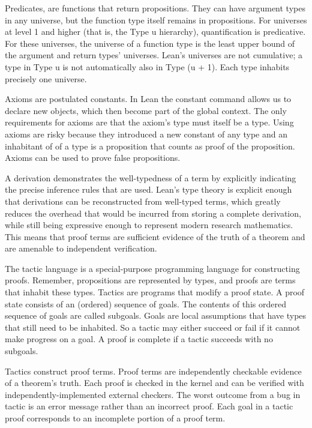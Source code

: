 \documentclass{article}
\newcommand{\1}{\mathbbm{1}}
\theoremstyle{plain}
\theoremstyle{definition}
\numberwithin{equation}{section}
\begin{document}
Predicates, are functions that return propositions. They can have argument types in any universe, but the function type itself remains in propositions. For universes at level 1 and higher (that is, the Type u hierarchy), quantification is predicative. For these universes, the universe of a function type is the least upper bound of the argument and return types' universes. Lean's universes are not cumulative; a type in Type u is not automatically also in Type (u + 1). Each type inhabits precisely one universe.

Axioms are postulated constants. In Lean the constant command allows us to declare new objects, which then become part of the global context. The only requirements for axioms are that the axiom’s type must itself be a type. Using axioms are risky because they introduced a new constant of any type and an inhabitant of of a type is a proposition that counts as proof of the proposition. Axioms can be used to prove false propositions. 

A derivation demonstrates the well-typedness of a term by explicitly indicating the precise inference rules that are used. Lean's type theory is explicit enough that derivations can be reconstructed from well-typed terms, which greatly reduces the overhead that would be incurred from storing a complete derivation, while still being expressive enough to represent modern research mathematics. This means that proof terms are sufficient evidence of the truth of a theorem and are amenable to independent verification.

The tactic language is a special-purpose programming language for constructing proofs. Remember, propositions are represented by types, and proofs are terms that inhabit these types. Tactics are programs that modify a proof state. A proof state consists of an (ordered) sequence of goals. The contents of this ordered sequence of goals are called subgoals. Goals are local assumptions that have types that still need to be inhabited. So a tactic may either succeed or fail if it cannot make progress on a goal. A proof is complete if a tactic succeeds with no subgoals.  

Tactics construct proof terms. Proof terms are independently checkable evidence of a theorem’s truth. Each proof is checked in the kernel and can be verified with independently-implemented external checkers. The worst outcome from a bug in tactic is an error message rather than an incorrect proof. Each goal in a tactic proof corresponds to an incomplete portion of a proof term. 
\end{document}
